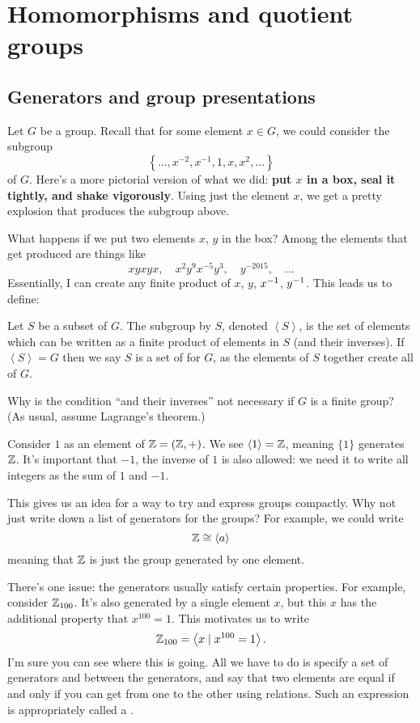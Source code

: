 \chapter{Homomorphisms and quotient groups}
\section{Generators and group presentations}
Let $G$ be a group. Recall that for some element $x \in G$, we could consider the subgroup
\[ \left\{ \dots, x^{-2}, x^{-1}, 1, x, x^2, \dots \right\} \]
of $G$.
Here's a more pictorial version of what we did: \textbf{put $x$ in a box, seal it tightly, and shake vigorously}.
Using just the element $x$, we get a pretty explosion that produces the subgroup above.

What happens if we put two elements $x$, $y$ in the box?
Among the elements that get produced are things like
\[ xyxyx, \quad x^2y^9x^{-5}y^3, \quad y^{-2015}, \quad \dots\]
Essentially, I can create any finite product of $x$, $y$, $x^{-1}$, $y^{-1}$.
This leads us to define:
\begin{definition}
	Let $S$ be a subset of $G$.  The subgroup  by $S$, denoted $\left<S\right>$, is the set of elements which can be written as a finite product of elements in $S$ (and their inverses).
	If $\left<S\right> = G$ then we say $S$ is a set of  for $G$,
	as the elements of $S$ together create all of $G$.
\end{definition}
\begin{exercise}
	Why is the condition ``and their inverses''
	not necessary if $G$ is  a finite group?
	(As usual, assume Lagrange's theorem.)
\end{exercise}

\begin{example}
	Consider $1$ as an element of $\mathbb Z = (\mathbb Z, +)$.
	We see $\left<1\right> = \mathbb Z$, meaning $\{1\}$ generates $\mathbb Z$.
	It's important that $-1$, the inverse of $1$ is also allowed:
	we need it to write all integers as the sum of $1$ and $-1$.
\end{example}

This gives us an idea for a way to try and express groups compactly.
Why not just write down a list of generators for the groups?
For example, we could write
\[ \mathbb Z \cong \left< a \right> \]
meaning that $\mathbb Z$ is just the group generated by one element.

There's one issue: the generators usually satisfy certain properties.
For example, consider $\mathbb Z_{100}$.
It's also generated by a single element $x$, but this $x$ has the additional property that $x^{100} = 1$.
This motivates us to write
\[ \mathbb Z_{100} = \left< x \mid x^{100} = 1 \right>. \]
I'm sure you can see where this is going.
All we have to do is specify a set of generators and  between the generators, and say that two elements are equal if and only if you can get from one to the other using relations.
Such an expression is appropriately called a .

